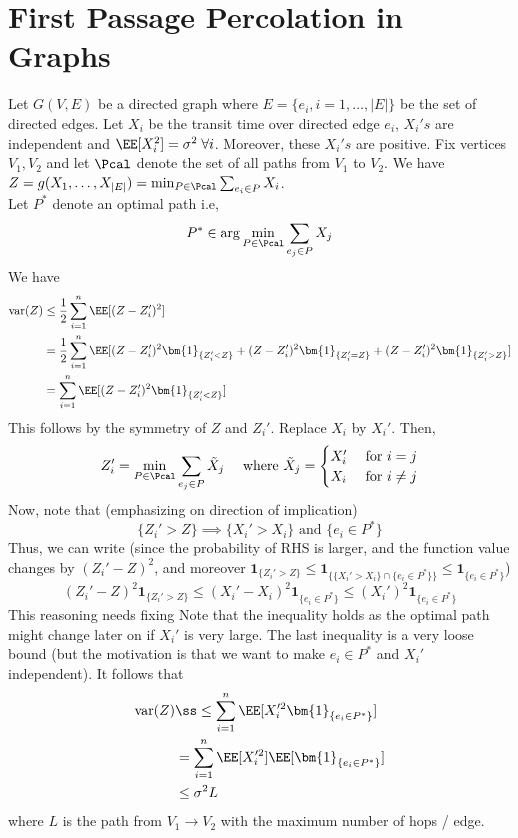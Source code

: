 \section{First Passage Percolation in Graphs}
Let $G(V,E)$ be a directed graph where $E = \{e_i, i=1,\dots, |E|\}$ be the set of directed edges. Let $X_i$ be the transit time over directed edge $e_i$, $X_i's$ are independent and $\EE[X_i^2] = \sigma^2 \; \forall i$. Moreover, these $X_i's$ are positive. Fix vertices $V_1, V_2$ and let $\Pcal$ denote the set of all paths from $V_1$ to $V_2$. We have $Z = g(X_1, \dots, X_{|E|}) = \min_{P \in \Pcal} \sum_{e_i \in P} X_i$. \\
Let $P^*$ denote an optimal path i.e, 
\[
P^* \in \arg\min_{P \in \Pcal} \sum_{e_j \in P} X_j
\]
We have
\begin{align*}
    \text{var}(Z) &\leq \frac{1}{2} \sum_{i=1}^n \EE[(Z - Z_i')^2] \\
    &= \frac{1}{2} \sum_{i=1}^n \EE[(Z - Z_i')^2 \bm{1}_{\{Z_i' < Z\}}
    + (Z - Z_i')^2 \bm{1}_{\{Z_i' = Z\}}
    + (Z - Z_i')^2 \bm{1}_{\{Z_i' > Z\}}
    ] \\
    &= \sum_{i=1}^n \EE[(Z - Z_i')^2 \bm{1}_{\{Z_i' < Z\}}]
\end{align*}
This follows by the symmetry of $Z$ and $Z_i'$. Replace $X_i$ by $X_i'$. Then,
\[
Z_i' = \min_{P \in \Pcal}\sum_{e_j \in P} \tilde{X}_j \quad \text{ where } \tilde{X}_j = \begin{cases}
X_i' &\text{ for } i = j \\
X_i &\text{ for } i \neq j
\end{cases}
\]
Now, note that (emphasizing on direction of implication)
\[
\{Z_i' > Z\} \implies \{X_i' > X_i\} \text{ and } \{e_i \in P^*\}
\]
Thus, we can write (since the probability of RHS is larger, and the function value changes by $(Z_i' - Z)^2$, and moreover $\bm1_{\{Z_i' > Z\}} \leq \bm1_{\{\{X_i' > X_i\} \cap \{e_i \in P^*\}\}} \leq \bm1_{\{e_i \in P^*\}}$)
\[
(Z_i' - Z)^2 \bm{1}_{\{Z_i' > Z\}} \leq (X_i' - X_i)^2 \bm{1}_{\{e_i \in P^*\}} \leq (X_i')^2 \bm{1}_{\{e_i \in P^*\}} 
\]
{\color{red} This reasoning needs fixing}
Note that the inequality holds as the optimal path might change later on if $X_i'$ is very large. The last inequality is a very loose bound (but the motivation is that we want to make $e_i \in P^*$ and $X_i'$ independent). It follows that
\begin{align*}
    \text{var}(Z) &ß\leq \sum_{i=1}^n \EE[X_i'^2 \bm{1}_{\{e_i \in P^*\}}] \\
    &= \sum_{i=1}^n \EE[X_i'^2]\EE[\bm{1}_{\{e_i \in P^*\}}] \\
    &\leq \sigma^2 L
\end{align*}
where $L$ is the path from $V_1 \to V_2$ with the maximum number of hops / edge.
